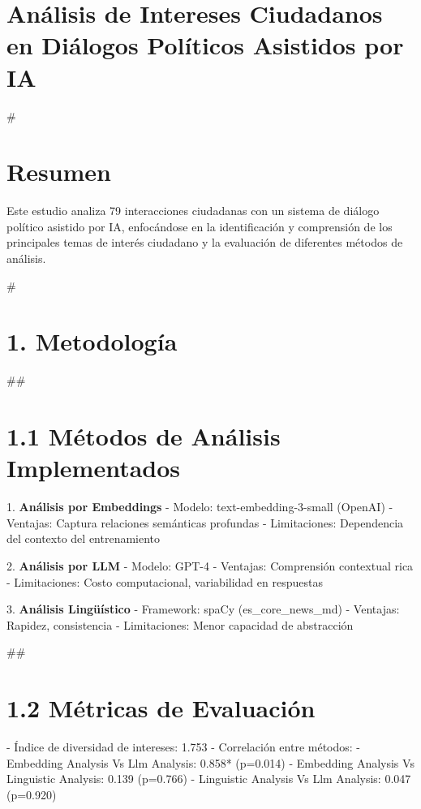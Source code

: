 \documentclass[12pt,a4paper]{article}
\author{Análisis de Resultados - Political Discourse Analyzer}
\date{\today}
\begin{document}
\maketitle

\section{Análisis de Intereses Ciudadanos en Diálogos Políticos Asistidos por IA}

            #\section{Resumen}
            Este estudio analiza 79 interacciones ciudadanas con un sistema de diálogo 
            político asistido por IA, enfocándose en la identificación y comprensión de los principales temas de 
            interés ciudadano y la evaluación de diferentes métodos de análisis.

            #\section{1. Metodología}

            ##\section{1.1 Métodos de Análisis Implementados}
            1. \textbf{Análisis por Embeddings}
            - Modelo: text-embedding-3-small (OpenAI)
            - Ventajas: Captura relaciones semánticas profundas
            - Limitaciones: Dependencia del contexto del entrenamiento

            2. \textbf{Análisis por LLM}
            - Modelo: GPT-4
            - Ventajas: Comprensión contextual rica
            - Limitaciones: Costo computacional, variabilidad en respuestas

            3. \textbf{Análisis Lingüístico}
            - Framework: spaCy (es_core_news_md)
            - Ventajas: Rapidez, consistencia
            - Limitaciones: Menor capacidad de abstracción

            ##\section{1.2 Métricas de Evaluación}
            - Índice de diversidad de intereses: 1.753
            - Correlación entre métodos:
              - Embedding Analysis Vs Llm Analysis: 0.858* (p=0.014)
  - Embedding Analysis Vs Linguistic Analysis: 0.139 (p=0.766)
  - Linguistic Analysis Vs Llm Analysis: 0.047 (p=0.920)
\end{document}
